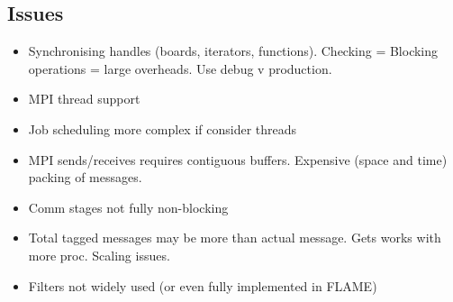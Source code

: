 \subsection{Issues}

\begin{itemize}
\item Synchronising handles (boards, iterators, functions). Checking = Blocking operations = large overheads. Use debug v production.
\item MPI thread support
\item Job scheduling more complex if consider threads
\item MPI sends/receives requires contiguous buffers. Expensive (space and time) packing of messages.
\item Comm stages not fully non-blocking
\item Total tagged messages may be more than actual message. Gets works with more proc. Scaling issues.
\item Filters not widely used (or even fully implemented in FLAME)
\end{itemize} 


